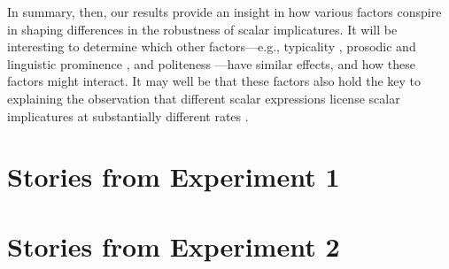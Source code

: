 \documentclass[12pt]{article}
\begin{document}
In summary, then, our results provide an insight in how various factors conspire in shaping differences in the robustness of scalar implicatures. It will be interesting to determine which other factors---e.g., typicality \citep{tiel2013}, prosodic and linguistic prominence \citep{breheny2006}, and politeness \citep{bonnefon2009}---have similar effects, and how these factors might interact. It may well be that these factors also hold the key to explaining the observation that different scalar expressions license scalar implicatures at substantially different rates \citep{tiel2016}.

\appendix

\section{Stories from Experiment 1}
\label{sec:mater-exper-1}


\section{Stories from Experiment 2}
\label{sec:mater-exper-2}


\normalsize



\end{document}
